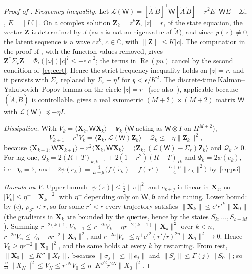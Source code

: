 \documentclass[11pt]{article}
\theoremstyle{definition}
\theoremstyle{remark}
\newcommand{\C}{\mathbb C}
\newcommand{\cF}{\mathcal F}
\newcommand{\Rea}{\operatorname{Re}}
\newcommand{\ip}[2]{\langle #1,#2\rangle}
\newcommand{\norm}[1]{\lVert #1\rVert}
\newcommand{\rhoF}{\rho_{\cF}}
\begin{document}
\begin{proof}[Proof of ]
\emph{Frequency inequality.}  Let
\(\mathcal L(\mathsf W)=[\tilde A\ \tilde B]^\top\mathsf W[\tilde A\ \tilde B]-r^2E^\top\mathsf W E+\Sigma_r\), \(E=[I\ 0]\).  On a complex
solution \(\mathbf Z_k=z^k\mathbf Z\), \(|z|=r\), of the state equation, the vector \(\mathbf Z\) is determined
by \(d\) (as \(z\) is not an eigenvalue of \(\tilde A\)), and since \(p(z)\ne0\), the latent
sequence is a wave \(cz^k\), \(c\in\C\), with \(\norm{\mathbf Z}\le K|c|\).  The computation in the
proof of , with the function values removed, gives
\(\mathbf Z^*\Sigma_r\mathbf Z=\Phi_t(|\omega|)|c|^2\le-\epsilon|c|^2\); the terms in \(\Rea(p\bar u)\) cancel by the
second condition of~\eqref{eq:cert}.  Hence the strict frequency inequality
holds on \(|z|=r\), and it persists with \(\Sigma_r\) replaced by \(\Sigma_r+\eta I\) for
\(\eta<\epsilon/K^2\).  The discrete-time Kalman--Yakubovich--Popov lemma on the circle
\(|z|=r\)~\cite[Lemma~2.4]{Gan22} (see also~\cite{Ran96}), applicable because \((\tilde A,\tilde B)\) is
controllable, gives a real symmetric \((M+2)\times(M+2)\) matrix \(\mathsf W\) with \(\mathcal L(\mathsf W)\preceq-\eta I\).

\emph{Dissipation.}  With \(V_k=\ip{\mathbf X_k}{\mathsf W\mathbf X_k}-\Psi_k\) (\(\mathsf W\) acting as \(\mathsf W\otimes I\) on \(H^{M+2}\)),
\[
V_{k+1}-r^2V_k=\ip{\mathbf Z_k}{\mathcal L(\mathsf W)\mathbf Z_k}-\mathcal Q_k\le-\eta\norm{\mathbf Z_k}^2,
\]
because \(\ip{\mathbf X_{k+1}}{\mathsf W\mathbf X_{k+1}}-r^2\ip{\mathbf X_k}{\mathsf W\mathbf X_k}=\ip{\mathbf Z_k}{(\mathcal L(\mathsf W)-\Sigma_r)\mathbf Z_k}\) and
\(\mathcal Q_k\ge0\).  For lag one, \(\mathcal Q_k=2(R+T)_{k,k+1}+2(1-r^2)(R+T)_{\star k}\) and \(\Psi_k=2\psi(e_k)\), i.e.\ \(\mathfrak b_0=2\), and
\(-2\psi(e_k)=\frac{4}{L-\mu}\bigl(f(\tilde x_k)-f(x^\star)-\frac{L+\mu}4\norm{e_k}^2\bigr)\) by~\eqref{eq:psi}.

\emph{Bounds on \(V\).}  Upper bound: \(|\psi(e)|\le\frac12\norm e^2\) and \(e_{k+j}\) is linear in
\(\mathbf X_k\), so \(|V_k|\le\eta^+\norm{\mathbf X_k}^2\) with \(\eta^+\) depending only on \(\mathsf W\), \(\mathfrak b\) and the tuning.  Lower bound: by (c), \(\rhoF<r\), so for some \(r'<r\) every
trajectory satisfies \(\norm{\mathbf X_k}\le c'r'^k\norm{\mathbf X_0}\) (the gradients in \(\mathbf X_k\) are
bounded by the queries, hence by the states \(S_k,\dots,S_{k+M}\)).  Summing
\(r^{-2(k+1)}V_{k+1}\le r^{-2k}V_k-\eta r^{-2(k+1)}\norm{\mathbf X_k}^2\) over \(k<n\),
\(r^{-2n}V_n\le V_0-\eta r^{-2}\norm{\mathbf X_0}^2\), and \(r^{-2n}|V_n|\le\eta^+c'^2(r'/r)^{2n}\norm{\mathbf X_0}^2\to0\).
Hence \(V_0\ge\eta r^{-2}\norm{\mathbf X_0}^2\), and the same holds at every \(k\) by restarting.
From rest, \(\norm{\mathbf X_0}\le K''\norm{X_0}\), because \(\norm{\sigma_j}\le\norm{e_j}\) and
\(\norm{S_j}\le\Gamma(j)\norm{S_0}\); so
\(\frac\eta{r^2}\norm{X_N}^2\le V_N\le r^{2N}V_0\le\eta^+K''^2r^{2N}\norm{X_0}^2\).
\end{proof}
\end{document}
